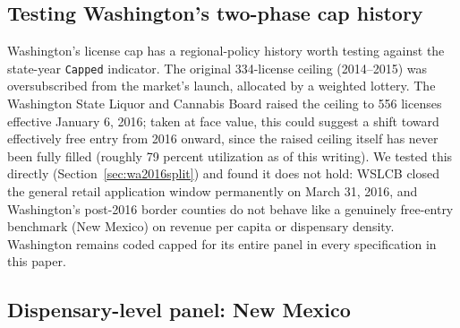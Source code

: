 \documentclass[12pt]{article}
\begin{document}
\subsection{Testing Washington's two-phase cap history}
\label{sec:localbarrier}

Washington's license cap has a regional-policy history worth testing against the state-year \texttt{Capped}
indicator. The original 334-license ceiling (2014--2015) was oversubscribed from the market's launch, allocated
by a weighted lottery. The Washington State Liquor and Cannabis Board raised the ceiling to 556 licenses
effective January 6, 2016; taken at face value, this could suggest a shift toward effectively free entry from
2016 onward, since the raised ceiling itself has never been fully filled (roughly 79 percent utilization as of
this writing). We tested this directly (Section~\ref{sec:wa2016split}) and found it does not hold: WSLCB closed
the general retail application window permanently on March 31, 2016, and Washington's post-2016 border
counties do not behave like a genuinely free-entry benchmark (New Mexico) on revenue per capita or dispensary
density. Washington remains coded capped for its entire panel in every specification in this paper.

\subsection{Dispensary-level panel: New Mexico}
\label{sec:nmdispensary}
\end{document}
